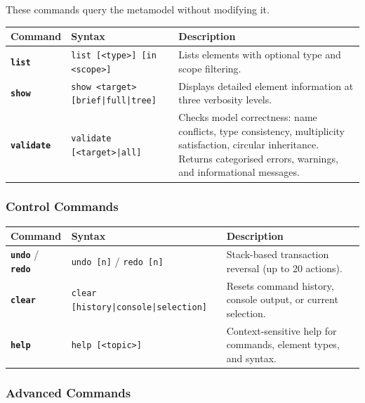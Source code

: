 \documentclass[11pt,a4paper]{article}
\newcommand{\kw}[1]{\texttt{\textbf{#1}}}
\begin{document}
These commands query the metamodel without modifying it.

\begin{center}
\small
\begin{tabularx}{\textwidth}{@{}llX@{}}
\toprule
\textbf{Command} & \textbf{Syntax} & \textbf{Description} \\
\midrule
\kw{list} & \texttt{list [<type>] [in <scope>]} &
    Lists elements with optional type and scope filtering. \\
\addlinespace
\kw{show} & \texttt{show <target> [brief|full|tree]} &
    Displays detailed element information at three verbosity levels. \\
\addlinespace
\kw{validate} & \texttt{validate [<target>|all]} &
    Checks model correctness: name conflicts, type consistency,
    multiplicity satisfaction, circular inheritance. Returns
    categorised errors, warnings, and informational messages. \\
\bottomrule
\end{tabularx}
\end{center}

\subsubsection{Control Commands}

\begin{center}
\small
\begin{tabularx}{\textwidth}{@{}llX@{}}
\toprule
\textbf{Command} & \textbf{Syntax} & \textbf{Description} \\
\midrule
\kw{undo} / \kw{redo} & \texttt{undo [n]} / \texttt{redo [n]} &
    Stack-based transaction reversal (up to 20 actions). \\
\addlinespace
\kw{clear} & \texttt{clear [history|console|selection]} &
    Resets command history, console output, or current selection. \\
\addlinespace
\kw{help} & \texttt{help [<topic>]} &
    Context-sensitive help for commands, element types, and syntax. \\
\bottomrule
\end{tabularx}
\end{center}

\subsubsection{Advanced Commands}
\end{document}
